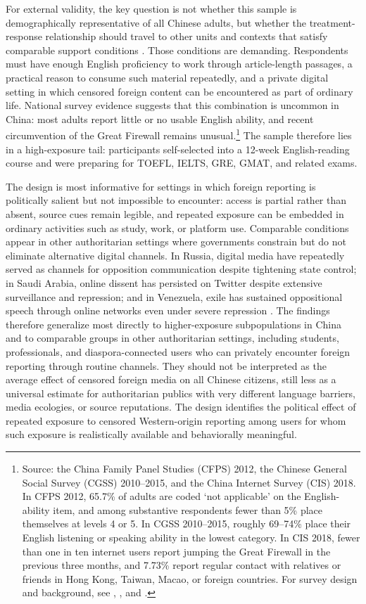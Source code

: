 \documentclass[12pt,american]{article}
\begin{document}
	For external validity, the key question is not whether this sample is demographically representative of all Chinese adults, but whether the treatment-response relationship should travel to other units and contexts that satisfy comparable support conditions \citep{EgamiHartman2023}. Those conditions are demanding. Respondents must have enough English proficiency to work through article-length passages, a practical reason to consume such material repeatedly, and a private digital setting in which censored foreign content can be encountered as part of ordinary life. National survey evidence suggests that this combination is uncommon in China: most adults report little or no usable English ability, and recent circumvention of the Great Firewall remains unusual.\footnote{Source: the China Family Panel Studies (CFPS) 2012, the Chinese General Social Survey (CGSS) 2010--2015, and the China Internet Survey (CIS) 2018. In CFPS 2012, 65.7\% of adults are coded `not applicable' on the English-ability item, and among substantive respondents fewer than 5\% place themselves at levels 4 or 5. In CGSS 2010--2015, roughly 69--74\% place their English listening or speaking ability in the lowest category. In CIS 2018, fewer than one in ten internet users report jumping the Great Firewall in the previous three months, and 7.73\% report regular contact with relatives or friends in Hong Kong, Taiwan, Macao, or foreign countries. For survey design and background, see \citet{XieHu2014CFPS}, \citet{BianLi2012CGSS}, and \citet{StockmannLuo2025CIS}.} The sample therefore lies in a high-exposure tail: participants self-selected into a 12-week English-reading course and were preparing for TOEFL, IELTS, GRE, GMAT, and related exams.

	The design is most informative for settings in which foreign reporting is politically salient but not impossible to encounter: access is partial rather than absent, source cues remain legible, and repeated exposure can be embedded in ordinary activities such as study, work, or platform use. Comparable conditions appear in other authoritarian settings where governments constrain but do not eliminate alternative digital channels. In Russia, digital media have repeatedly served as channels for opposition communication despite tightening state control; in Saudi Arabia, online dissent has persisted on Twitter despite extensive surveillance and repression; and in Venezuela, exile has sustained oppositional speech through online networks even under severe repression \citep{GainousWagnerZiegler2018,PanSiegel2020APSR,EsbergSiegel2023APSR}. The findings therefore generalize most directly to higher-exposure subpopulations in China and to comparable groups in other authoritarian settings, including students, professionals, and diaspora-connected users who can privately encounter foreign reporting through routine channels. They should not be interpreted as the average effect of censored foreign media on all Chinese citizens, still less as a universal estimate for authoritarian publics with very different language barriers, media ecologies, or source reputations. The design identifies the political effect of repeated exposure to censored Western-origin reporting among users for whom such exposure is realistically available and behaviorally meaningful.
	
\end{document}
